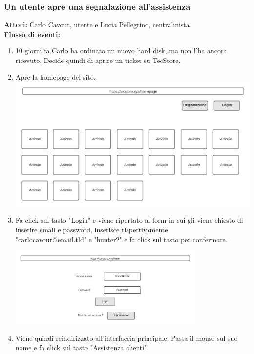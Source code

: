 \documentclass[12pt,a4paper]{article}
\begin{document}
\subsubsection{Un utente apre una segnalazione all'assistenza}
\textbf{Attori:} Carlo Cavour, utente e Lucia Pellegrino, centralinista \\
\noindent
\textbf{Flusso di eventi:}
\begin{enumerate}
\item 10 giorni fa Carlo ha ordinato un nuovo hard disk, ma non l'ha ancora ricevuto. Decide quindi di aprire un ticket su TecStore.

\item Apre la homepage del sito. \\

\includegraphics[width=\textwidth]{Mockup/homepage}

\item Fa click sul tasto "Login" e viene riportato al form in cui gli viene chiesto di inserire email e password, inserisce rispettivamente \\ "carlocavour@email.tld" e "hunter2" e fa click sul tasto per confermare.

\includegraphics[height=150px]{Mockup/login}

\newpage
\item Viene quindi reindirizzato all'interfaccia principale. Passa il mouse sul suo nome e fa click sul tasto "Assistenza clienti".


\end{enumerate}
\end{document}
